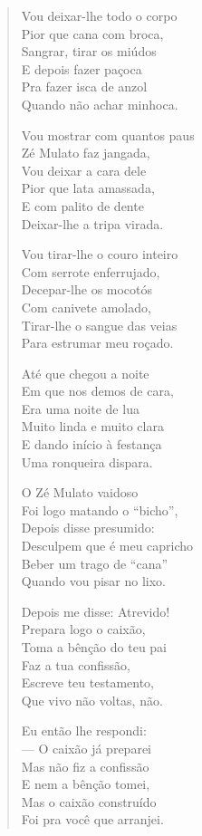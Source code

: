 \begin{verse}
Vou deixar-lhe todo o corpo\\
Pior que cana com broca,\\
Sangrar, tirar os miúdos\\
E depois fazer paçoca\\
Pra fazer isca de anzol\\
Quando não achar minhoca.

Vou mostrar com quantos paus\\
Zé Mulato faz jangada,\\
Vou deixar a cara dele\\
Pior que lata amassada,\\
E com palito de dente\\
Deixar-lhe a tripa virada.

Vou tirar-lhe o couro inteiro\\
Com serrote enferrujado, \\
Decepar-lhe os mocotós\\
Com canivete amolado,\\
Tirar-lhe o sangue das veias\\
Para estrumar meu roçado.


Até que chegou a noite\\
Em que nos demos de cara,\\
Era uma noite de lua\\
Muito linda e muito clara\\
E dando início à festança\\
Uma ronqueira dispara.

O Zé Mulato vaidoso\\
Foi logo matando o “bicho”,\\
Depois disse presumido:\\
Desculpem que é meu capricho\\
Beber um trago de “cana”\\
Quando vou pisar no lixo.

Depois me disse: Atrevido!\\
Prepara logo o caixão,\\
Toma a bênção do teu pai\\
Faz a tua confissão,\\
Escreve teu testamento,\\
Que vivo não voltas, não.

Eu então lhe respondi: \\
— O caixão já preparei\\
Mas não fiz a confissão\\
E nem a bênção tomei,\\
Mas o caixão construído\\
Foi pra você que arranjei.



\end{verse}
